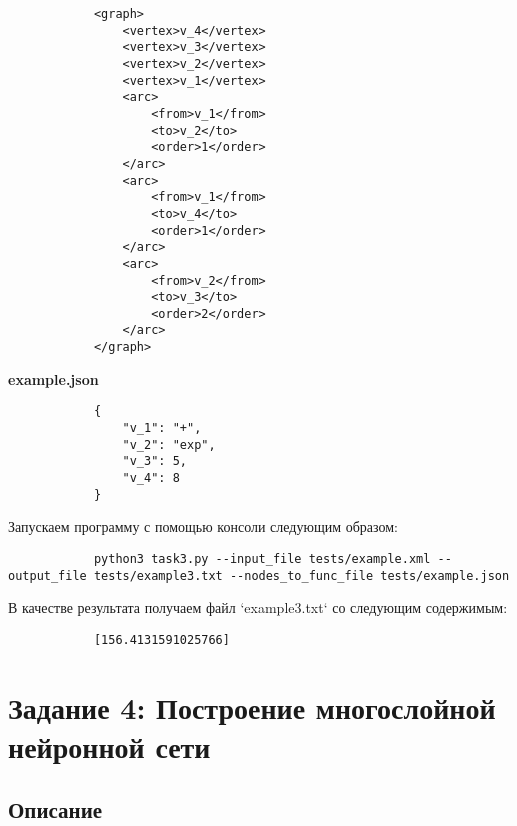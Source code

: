 \documentclass[bachelor, och, report]{shiza}
\begin{document}
        \begin{verbatim}
            <graph>
                <vertex>v_4</vertex>
                <vertex>v_3</vertex>
                <vertex>v_2</vertex>
                <vertex>v_1</vertex>
                <arc>
                    <from>v_1</from>
                    <to>v_2</to>
                    <order>1</order>
                </arc>
                <arc>
                    <from>v_1</from>
                    <to>v_4</to>
                    <order>1</order>
                </arc>
                <arc>
                    <from>v_2</from>
                    <to>v_3</to>
                    <order>2</order>
                </arc>
            </graph>      
        \end{verbatim}


        \textbf{example.json}
        \begin{verbatim}
            {
                "v_1": "+",
                "v_2": "exp",
                "v_3": 5,
                "v_4": 8
            }
        \end{verbatim}
        
        Запускаем программу с помощью консоли следующим образом:

        \begin{verbatim}
            python3 task3.py --input_file tests/example.xml --output_file tests/example3.txt --nodes_to_func_file tests/example.json
        \end{verbatim}

        В качестве результата получаем файл `example3.txt` со следующим содержимым:

        \begin{verbatim}
            [156.4131591025766]
        \end{verbatim}

\section{Задание 4: Построение многослойной нейронной сети}
    \subsection{Описание}
\end{document}
